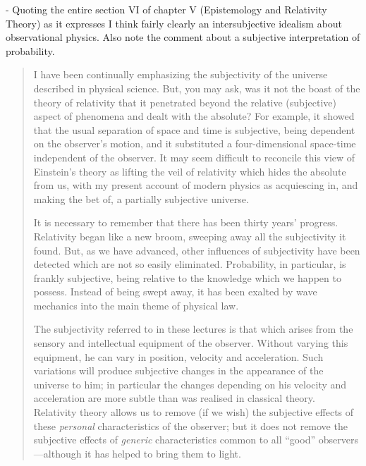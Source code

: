 - Quoting the entire section VI of chapter V (Epistemology and Relativity Theory) as it expresses I think fairly clearly an intersubjective idealism about observational physics.  Also note the comment about a subjective interpretation of probability.

\begin{quote}
    I have been continually emphasizing the subjectivity of the universe described in physical science.  But, you may ask, was it not the boast of the theory of relativity that it penetrated beyond the relative (subjective) aspect of phenomena and dealt with the absolute?  For example, it showed that the usual separation of space and time is subjective, being dependent on the observer's motion, and it substituted a four-dimensional space-time independent of the observer.  It may seem difficult to reconcile this view of Einstein's theory as lifting the veil of relativity which hides the absolute from us, with my present account of modern physics as acquiescing in, and making the bet of, a partially subjective universe.

    It is necessary to remember that there has been thirty years' progress.  Relativity began like a new broom, sweeping away all the subjectivity it found.  But, as we have advanced, other influences of subjectivity have been detected which are not so easily eliminated.  Probability, in particular, is frankly subjective, being relative to the knowledge which we happen to possess.  Instead of being swept away, it has been exalted by wave mechanics into the main theme of physical law.

    The subjectivity referred to in these lectures is that which arises from the sensory and intellectual equipment of the observer.  Without varying this equipment, he can vary in position, velocity and acceleration.  Such variations will produce subjective changes in the appearance of the universe to him; in particular the changes depending on his velocity and acceleration are more subtle than was realised in classical theory.  Relativity theory allows us to remove (if we wish) the subjective effects of these \emph{personal} characteristics of the observer; but it does not remove the subjective effects of \emph{generic} characteristics common to all ``good'' observers---although it has helped to bring them to light.


\end{quote}

